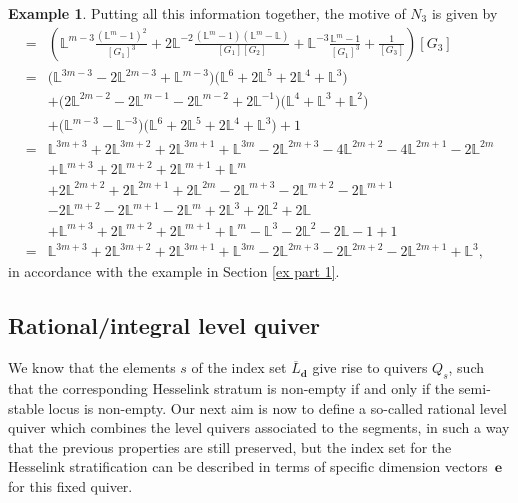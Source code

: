 \documentclass[pdftex]{sigma}
\numberwithin{equation}{section}
\theoremstyle{definition}
\newtheorem{Example}[Theorem]{Example}
\begin{document}
\begin{Example}
Putting all this information together, the motive of $N_3$ is given by
\begin{align*}
[N_3]={}& \left( \mathbb{L}^{m-3} \frac{(\mathbb{L}^{m}-1)^2}{[G_1]^3} + 2 \mathbb{L}^{-2} \frac{(\mathbb{L}^m -1)(\mathbb{L}^m-\mathbb{L})}{[G_1][G_2]} + \mathbb{L}^{-3} \frac{\mathbb{L}^m -1}{[G_1]^3} + \frac{1}{[G_3]}\right) [G_3] \\
={}& \bigl(\mathbb{L}^{3m-3} -2 \mathbb{L}^{2m-3}+\mathbb{L}^{m-3}\bigr) \bigl( \mathbb{L}^6 + 2 \mathbb{L}^5 +2 \mathbb{L}^4 + \mathbb{L}^3\bigr) \\
& + \bigl(2\mathbb{L}^{2m-2} - 2 \mathbb{L}^{m-1}-2 \mathbb{L}^{m-2}+2\mathbb{L}^{-1}\bigr) \bigl( \mathbb{L}^4 + \mathbb{L}^3 + \mathbb{L}^2 \bigr) \\
& + \bigl(\mathbb{L}^{m-3} - \mathbb{L}^{-3}\bigr) \bigl(\mathbb{L}^6 + 2 \mathbb{L}^5 +2 \mathbb{L}^4 + \mathbb{L}^3 \bigr) +1\\
={}& \mathbb{L}^{3m+3} + 2\mathbb{L}^{3m+2} + 2\mathbb{L}^{3m+1} + \mathbb{L}^{3m}-2\mathbb{L}^{2m+3} - 4\mathbb{L}^{2m+2} - 4\mathbb{L}^{2m+1} - 2\mathbb{L}^{2m} \\
& + \mathbb{L}^{m+3} + 2\mathbb{L}^{m+2} +2\mathbb{L}^{m+1} + \mathbb{L}^{m} \\
& + 2 \mathbb{L}^{2m+2} +2 \mathbb{L}^{2m+1} +2 \mathbb{L}^{2m} -
2 \mathbb{L}^{m+3} -2 \mathbb{L}^{m+2} -2 \mathbb{L}^{m+1} \\
& - 2 \mathbb{L}^{m+2} -2 \mathbb{L}^{m+1} -2 \mathbb{L}^{m} + 2 \mathbb{L}^{3} + 2 \mathbb{L}^2 +2 \mathbb{L} \\
& + \mathbb{L}^{m+3} + 2 \mathbb{L}^{m+2} + 2\mathbb{L}^{m+1} + \mathbb{L}^{m} - \mathbb{L}^3 - 2 \mathbb{L}^2 - 2 \mathbb{L} - 1 +1 \\
={}& \mathbb{L}^{3m+3} + 2\mathbb{L}^{3m+2} + 2\mathbb{L}^{3m+1} + \mathbb{L}^{3m} - 2\mathbb{L}^{2m+3} - 2\mathbb{L}^{2m+2} -2 \mathbb{L}^{2m+1} + \mathbb{L}^3 ,
\end{align*}
 in accordance with the example in Section \ref{ex part 1}.
\end{Example}

\subsection{Rational/integral level quiver}

We know that the elements $s$ of the index set ${\overline{L}_{\mathbf{d}}}$ give rise to quivers $Q_s$, such that the corresponding Hesselink stratum is non-empty if and only if the semi-stable locus is non-empty. Our next aim is now to define a so-called rational level quiver which combines the level quivers associated to the segments, in such a way that the previous properties are still preserved, but the index set for the Hesselink stratification can be described in terms of specific dimension vectors~$\mathbf{e}$ for this fixed quiver.
\end{document}

